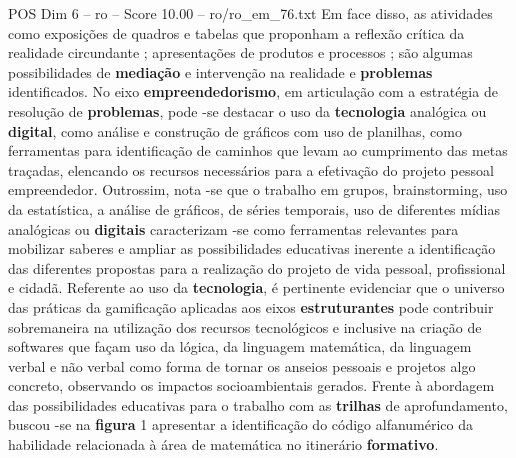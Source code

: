\begin{textsample}{POS Dim 6 – ro – Score 10.00 – ro/ro\_em\_76.txt}
Em face disso, as atividades como exposições de quadros e tabelas que proponham a reflexão crítica da realidade circundante ; apresentações de produtos e processos ; são algumas possibilidades de \textbf{mediação} e intervenção na realidade e \textbf{problemas} identificados.
No eixo \textbf{empreendedorismo}, em articulação com a estratégia de resolução de \textbf{problemas}, pode -se destacar o uso da \textbf{tecnologia} analógica ou \textbf{digital}, como análise e construção de gráficos com uso de planilhas, como ferramentas para identificação de caminhos que levam ao cumprimento das metas traçadas, elencando os recursos necessários para a efetivação do projeto pessoal empreendedor.
Outrossim, nota -se que o trabalho em grupos, brainstorming, uso da estatística, a análise de gráficos, de séries temporais, uso de diferentes mídias analógicas ou \textbf{digitais} caracterizam -se como ferramentas relevantes para mobilizar saberes e ampliar as possibilidades educativas inerente a identificação das diferentes propostas para a realização do projeto de vida pessoal, profissional e cidadã.
Referente ao uso da \textbf{tecnologia}, é pertinente evidenciar que o universo das práticas da gamificação aplicadas aos eixos \textbf{estruturantes} pode contribuir sobremaneira na utilização dos recursos tecnológicos e inclusive na criação de softwares que façam uso da lógica, da linguagem matemática, da linguagem verbal e não verbal como forma de tornar os anseios pessoais e projetos algo concreto, observando os impactos socioambientais gerados.
Frente à abordagem das possibilidades educativas para o trabalho com as \textbf{trilhas} de aprofundamento, buscou -se na \textbf{figura} 1 apresentar a identificação do código alfanumérico da habilidade relacionada à área de matemática no itinerário \textbf{formativo}.

\end{textsample}
